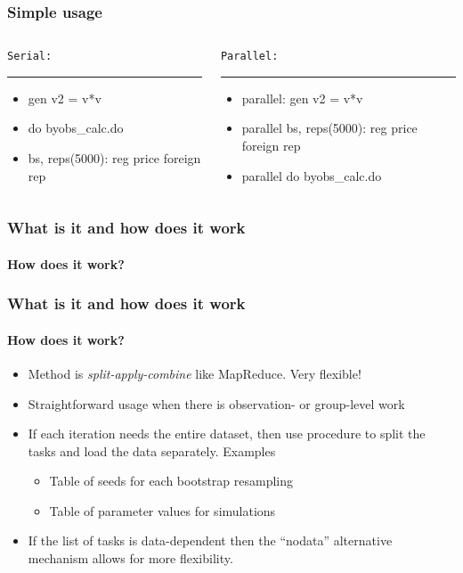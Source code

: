 \documentclass[9pt,\ExtraDocOpts]{beamer}
\begin{document}
\begin{frame}
\frametitle{Simple usage}

\begin{columns}
\begin{column}{.5\textwidth}
{\color{gray}
{\tt Serial: }
\rule{\linewidth}{4pt}}
\begin{itemize}
\item gen v2 = v*v
\item do byobs\_calc.do
\item bs, reps(5000): reg price foreign rep\pause{}
\end{itemize}
\end{column}%
\hfill%
\begin{column}{.5\textwidth}
{\color{gray}
{\tt Parallel:}
\rule{\linewidth}{4pt}}
\begin{itemize}
\item parallel: gen v2 = v*v
\item parallel bs, reps(5000): reg price foreign rep
\item parallel do byobs\_calc.do
\end{itemize}
\end{column}%
\end{columns}
\end{frame}


\begin{frame}[b]
\frametitle{What is it and how does it work}
\framesubtitle{How does it work?}
\begin{figure}
\centering
\scalebox{.7}{}
\end{figure}
\end{frame}

\begin{frame} %
\frametitle{What is it and how does it work}
\framesubtitle{How does it work?}

\begin{itemize}
\item Method is \textit{split-apply-combine} like MapReduce. Very flexible!\pause{}
\item Straightforward usage when there is observation- or group-level work\pause{}
\item If each iteration needs the entire dataset, then use procedure to split the tasks and load the data separately. Examples\pause{}
\begin{itemize}
\item Table of seeds for each bootstrap resampling\pause{}
\item Table of parameter values for simulations\pause{}
\end{itemize}
\item If the list of tasks is data-dependent then the ``nodata'' alternative mechanism allows for more flexibility.
\end{itemize}

\end{frame}
\end{document}
